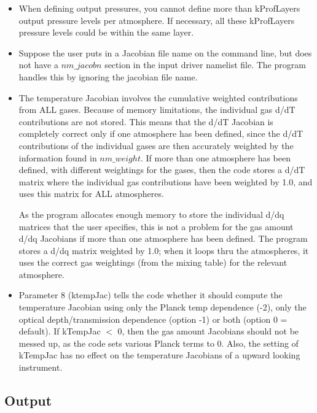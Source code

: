 \documentclass[12pt]{article}
\begin{document}
{{{\begin{itemize}
\item When defining output pressures, you cannot define more than kProfLayers
  output pressure levels per atmosphere.  If necessary, all these kProfLayers
  pressure levels could be within the same layer.
  
\item Suppose the user puts in a Jacobian file name on the command line, 
      but does not have a $nm\_jacobn$ section in the input driver namelist 
      file. The program handles this by ignoring the jacobian file name.

\item The temperature Jacobian involves the cumulative weighted
  contributions from ALL gases.  Because of memory limitations, the
  individual gas d/dT contributions are not stored.  This means that
  the d/dT Jacobian is completely correct only if one atmosphere has
  been defined, since the d/dT contributions of the individual gases
  are then accurately weighted by the information found in $nm\_weight$.  If
  more than one atmosphere has been defined, with different weightings
  for the gases, then the code stores a d/dT matrix where the
  individual gas contributions have been weighted by 1.0, and uses
  this  matrix for ALL atmospheres.
  
  As the program allocates enough memory to store the individual d/dq
  matrices that the user specifies, this is not a problem for the gas
  amount d/dq Jacobians if more than one atmosphere has been defined.
  The program stores a d/dq matrix weighted by 1.0; when it loops thru
  the atmospheres, it uses the correct gas weightings (from the mixing
  table) for the relevant atmosphere.

\item Parameter 8 (ktempJac) tells the code whether it should compute the 
  temperature Jacobian using only the Planck temp dependence (-2), only
  the optical depth/transmission dependence (option -1) or both (option 0 
  = default). If kTempJac $<$ 0, then the gas amount Jacobians should not 
  be messed up, as the code sets various Planck terms to 0. Also, the 
  setting of kTempJac has no effect on the temperature Jacobians of a 
  upward looking instrument.

\end{itemize}

\subsection{Output}

}}}
\end{document}
